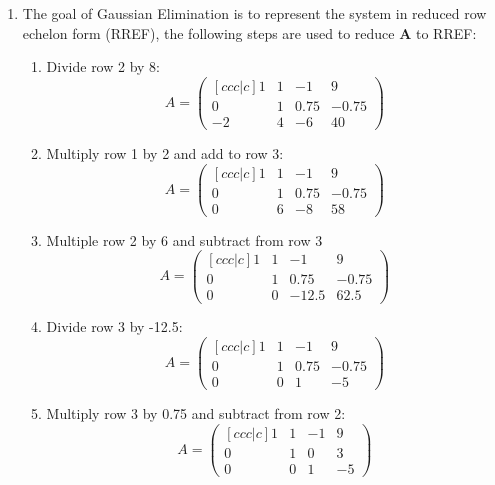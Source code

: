 \begin{enumerate}
	\item The goal of Gaussian Elimination is to represent the system in reduced row echelon form (RREF), the following steps are used to reduce $\boldsymbol{A}$ to RREF:
	
	\begin{enumerate}
		\item Divide row 2 by 8:
			\begin{equation*}A=
				\begin{pmatrix}[ccc|c]
					1&1&-1&9\\0&1&0.75&-0.75\\-2&4&-6&40
			\end{pmatrix}
			\end{equation*}

		\item Multiply row 1 by 2 and add to row 3:
			\begin{equation*}A=
				\begin{pmatrix}[ccc|c]
					1&1&-1&9\\0&1&0.75&-0.75\\0&6&-8&58
				\end{pmatrix}
			\end{equation*}
		\item Multiple row 2 by 6 and subtract from row 3
			\begin{equation*}A=
				\begin{pmatrix}[ccc|c]
					1&1&-1&9\\0&1&0.75&-0.75\\0&0&-12.5&62.5
				\end{pmatrix}
			\end{equation*}
		\item Divide row 3 by -12.5:
			\begin{equation*}A=
				\begin{pmatrix}[ccc|c]
					1&1&-1&9\\0&1&0.75&-0.75\\0&0&1&-5
			\end{pmatrix}
			\end{equation*}
		\item Multiply row 3 by 0.75 and subtract from row 2:
			\begin{equation*}A=
				\begin{pmatrix}[ccc|c]
					1&1&-1&9\\0&1&0&3\\0&0&1&-5
			\end{pmatrix}
			\end{equation*}

\end{enumerate}
\end{enumerate}
